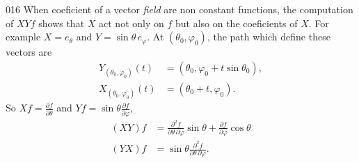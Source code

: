 \begin{corrige}{016}
When coeficient of a vector \emph{field} are non constant functions, the computation of $XYf$ shows that $X$ act not only on $f$ but also on the coeficients of $X$. For example $X=e_{\theta}$ and $Y=\sin\theta\, e_{\varphi}$. At $(\theta_0,\varphi_0)$, the path which define these vectors are
\begin{subequations}
\begin{align}
  Y_{(\theta_0,\varphi_0)}(t)&=(\theta_0,\varphi_0+t\sin\theta_0),\\
  X_{(\theta_0,\varphi_0)}(t)&=(\theta_0+t,\varphi_0).
\end{align}
\end{subequations}
So $Xf=\frac{ \partial f }{ \partial \theta }$ and $Yf=\sin\theta\frac{ \partial f }{ \partial \varphi }$,
\begin{equation}
\begin{aligned}
  (XY)f&=\frac{ \partial^2 f }{ \partial \theta\,\partial\varphi }\sin\theta+\frac{ \partial f }{ \partial \varphi }\cos\theta\\
	(YX)f&=\sin\theta\frac{ \partial^2f }{ \partial \theta\,\partial\varphi }.
\end{aligned}
\end{equation}

\end{corrige}

